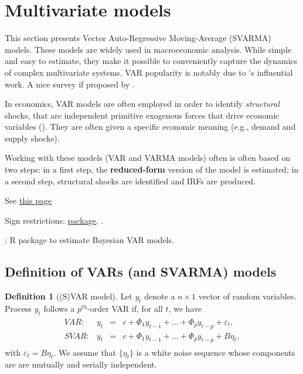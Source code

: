 \documentclass[
  12pt,
]{book}
\theoremstyle{definition}
\newtheorem{definition}{Definition}[chapter]
\theoremstyle{definition}
\theoremstyle{definition}
\theoremstyle{definition}
\theoremstyle{remark}
\begin{document}
\hypertarget{VAR}{%
\section{Multivariate models}\label{VAR}}

This section presents Vector Auto-Regressive Moving-Average (SVARMA) models. These models are widely used in macroeconomic analysis. While simple and easy to estimate, they make it possible to conveniently capture the dynamics of complex multivariate systems. VAR popularity is notably due to \citet{Sims_1980}'s influential work. A nice survey if proposed by \citet{Stock_Watson_2016}.

In economics, VAR models are often employed in order to identify \emph{structural} shocks, that are independent primitive exogenous forces that drive economic variables (\citet{Ramey_2016_NBER}). They are often given a specific economic meaning (e.g., demand and supply shocks).

Working with these models (VAR and VARMA models) often is often based on two steps: in a first step, the \textbf{reduced-form} version of the model is estimated; in a second step, structural shocks are identified and IRFs are produced.

\citet{Kilian_1998} See \href{https://rdrr.io/cran/VAR.etp/man/VAR.Boot.html}{this page}

Sign restrictions: \href{https://github.com/chrstdanne/VARsignR}{package}, \citet{Danne_2015}.

\citet{vars}

\citet{bvartools}: R package to estimate Bayesian VAR models.

\hypertarget{definition-of-vars-and-svarma-models}{%
\subsection{Definition of VARs (and SVARMA) models}\label{definition-of-vars-and-svarma-models}}

\begin{definition}[(S)VAR model]
\protect\hypertarget{def:SVAR}{}\label{def:SVAR}Let \(y_{t}\) denote a \(n \times1\) vector of random variables. Process \(y_{t}\) follows a \(p^{th}\)-order VAR if, for all \(t\), we have
\begin{eqnarray}
\begin{array}{rllll}
VAR:& y_t &=& c + \Phi_1 y_{t-1} + \dots + \Phi_p y_{t-p} + \varepsilon_t,\\
SVAR:& y_t &=& c + \Phi_1 y_{t-1} + \dots + \Phi_p y_{t-p} + B \eta_t,
\end{array}\label{eq:yVAR}
\end{eqnarray}
with \(\varepsilon_t = B\eta_t\). We assume that \(\{\eta_{t}\}\) is a white noise sequence whose components are are mutually and serially independent.
\end{definition}
\end{document}
